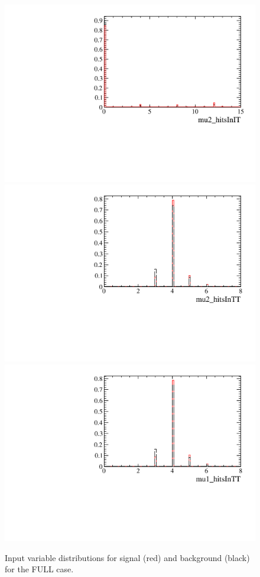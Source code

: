 \begin{figure} [htb!]
\begin{center}
\includegraphics[scale=0.20]{figs/mu2_hitsInITFULL.pdf}
\includegraphics[scale=0.20]{figs/mu2_hitsInTTFULL.pdf}
\includegraphics[scale=0.20]{figs/mu1_hitsInTTFULL.pdf}
\caption{Input variable distributions for signal (red) and background (black) for the FULL case. \label{fig:MVAhistos_FULL1}}
\end{center}
\end{figure}

